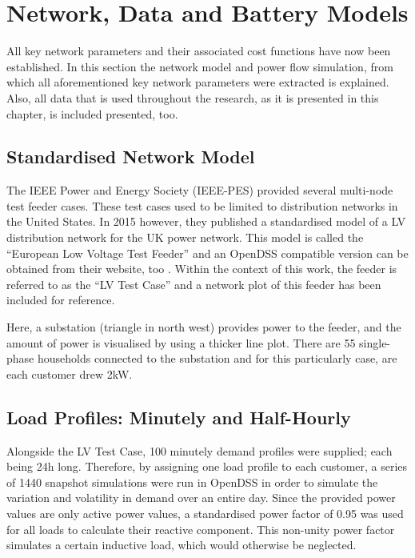 \section{Network, Data and Battery Models}
\label{ch1:sec:data-and-network-models}

All key network parameters and their associated cost functions have now been established.
In this section the network model and power flow simulation, from which all aforementioned key network parameters were extracted is explained.
Also, all data that is used throughout the research, as it is presented in this chapter, is included presented, too.

\subsection{Standardised Network Model}
\label{ch1:subsec:standardised-network-model}

The IEEE Power and Energy Society (IEEE-PES) provided several multi-node test feeder cases.
These test cases used to be limited to distribution networks in the United States.
In 2015 however, they published a standardised model of a LV distribution network for the UK power network.
This model is called the ``European Low Voltage Test Feeder'' and an OpenDSS compatible version can be obtained from their website, too \cite{DistributionTestFeeders2017}.
Within the context of this work, the feeder is referred to as the ``LV Test Case'' and a network plot of this feeder has been included for reference.



Here, a substation (triangle in north west) provides power to the feeder, and the amount of power is visualised by using a thicker line plot.
There are 55 single-phase households connected to the substation and for this particularly case, are each customer drew 2kW.

\subsection{Load Profiles: Minutely and Half-Hourly}

Alongside the LV Test Case, 100 minutely demand profiles were supplied; each being 24h long.
Therefore, by assigning one load profile to each customer, a series of 1440 snapshot simulations were run in OpenDSS in order to simulate the variation and volatility in demand over an entire day.
Since the provided power values are only active power values, a standardised power factor of 0.95 was used for all loads to calculate their reactive component.
This non-unity power factor simulates a certain inductive load, which would otherwise be neglected.

